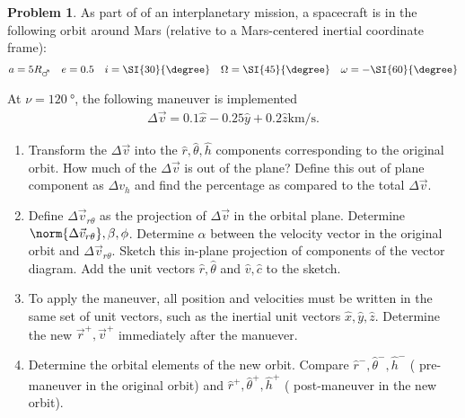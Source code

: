 \documentclass[10pt]{article}
\theoremstyle{definition}
\newtheorem{prob}{Problem}[section]
\newenvironment{subprob}%
{\renewcommand{\theenumi}{\alph{enumi}}\renewcommand{\labelenumi}{(\theenumi)}\begin{enumerate}}%
{\end{enumerate}}%
\begin{document}
\begin{prob}
    As part of of an interplanetary mission, a spacecraft is in the following orbit around Mars (relative to a Mars-centered inertial coordinate frame):
    \begin{align*}
        a = 5 R_{\mars} \quad e = 0.5 \quad i = \SI{30}{\degree} \quad \Omega = \SI{45}{\degree} \quad \omega = - \SI{60}{\degree}
    \end{align*}

    At \( \nu = \SI{120}{\degree} \), the following maneuver is implemented
    \begin{align*}
        \Delta \vec v = 0.1 \hat x - 0.25 \hat y + 0.2 \hat z \si{\kilo\meter\per\second} .
    \end{align*}

    \begin{subprob}
    \item Transform the \( \Delta \vec v\) into the \( \hat r, \hat \theta, \hat h\) components corresponding to the original orbit.
        How much of the \( \Delta \vec v \) is out of the plane?
        Define this out of plane component as \( \Delta v_h \) and find the percentage as compared to the total \( \Delta \vec v \).
    \item Define \( \Delta \vec v_{r\theta} \) as the projection of \( \Delta \vec v \) in the orbital plane. 
        Determine \( \norm{\Delta \vec v_{r\theta}}, \beta, \phi \).
        Determine  \( \alpha \)  between the velocity vector in the original orbit and \( \Delta \vec v_{r\theta}\).
        Sketch this in-plane projection of components of the vector diagram.
        Add the unit vectors \( \hat r, \hat \theta\) and \( \hat v, \hat c \) to the sketch.
    \item To apply the maneuver, all position and velocities must be written in the same set of unit vectors, such as the inertial unit vectors \( \hat x, \hat y, \hat z \).
        Determine the new \( \vec r^{+}, \vec v^{+} \) immediately after the manuever.
    \item Determine the orbital elements of the new orbit.
        Compare \( \hat r^- , \hat \theta^-, \hat h ^-\) ( pre-maneuver in the original orbit) and \( \hat r^+, \hat \theta^+, \hat h^+\) ( post-maneuver in the new orbit).
    \end{subprob}
\end{prob}
\end{document}
